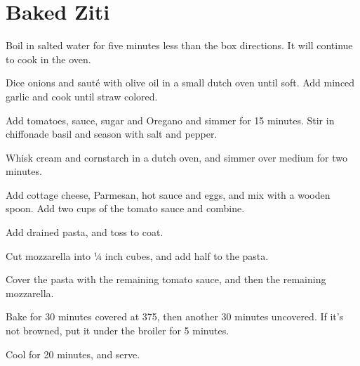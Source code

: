 

\section{Baked Ziti}
\begin{recipe}



Boil in salted water for five minutes less than the box directions. It will continue to cook in the oven.


Dice onions and sauté with olive oil in a small dutch oven until soft. Add minced garlic and cook until straw colored.

Add tomatoes, sauce, sugar and Oregano and simmer for 15 minutes. Stir in chiffonade basil and season with salt and pepper.


Whisk cream and cornstarch in a dutch oven, and simmer over medium for two minutes.

Add cottage cheese, Parmesan, hot sauce and eggs, and mix with a wooden spoon. Add two cups of the tomato sauce and combine.

Add drained pasta, and toss to coat.


Cut mozzarella into ¼ inch cubes, and add half to the pasta.

Cover the pasta with the remaining tomato sauce, and then the remaining mozzarella.

Bake for 30 minutes covered at 375\degree, then another 30 minutes uncovered. If it's not browned, put it under the broiler for 5 minutes.

Cool for 20 minutes, and serve.

\end{recipe}

